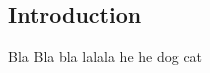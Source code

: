  



\newpage

\begin{multicols}{2} %

\section{Introduction}

Bla Bla bla lalala he he dog cat

\end{multicols}

